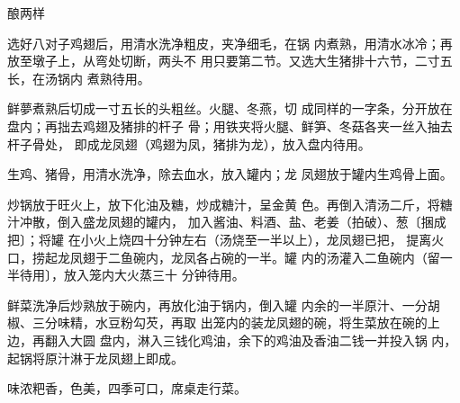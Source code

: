 \begin{recipe}[酿龙凤翅]{酿两样}

\ingredients


\cooking

\step 选好八对子鸡翅后，用清水洗净粗皮，夹净细毛，在锅 内煮熟，用清水冰冷；再放至墩子上，从弯处切断，两头不 用只要第二节。又选大生猪排十六节，二寸五长，在汤锅内 煮熟待用。

\step 	鲜夢煮熟后切成一寸五长的头粗丝。火腿、冬燕，切 成同样的一字条，分开放在盘内；再拙去鸡翅及猪排的杆子 骨；用铁夹将火腿、鲜笋、冬菇各夹一丝入抽去杆子骨处， 即成龙凤翅（鸡翅为凤，猪排为龙），放入盘内待用。

\step 	生鸡、猪骨，用清水洗净，除去血水，放入罐内；龙 凤翅放于罐内生鸡骨上面。

\step 	炒锅放于旺火上，放下化油及糖，炒成糖汁，呈金黄 色。再倒入清汤二斤，将糖汁冲散，倒入盛龙凤翅的罐内， 加入酱油、料酒、盐、老姜（拍破）、葱〔捆成把〕；将罐 在小火上烧四十分钟左右（汤烧至一半以上），龙凤翅已把， 提离火口，捞起龙凤翅于二鱼碗内，龙凤各占碗的一半。罐 内的汤灌入二鱼碗内（留一半待用〕，放入笼内大火蒸三十 分钟待用。

\step 	鲜菜洗净后炒熟放于碗内，再放化油于锅内，倒入罐 内余的一半原汁、一分胡椒、三分味精，水豆粉勾芡，再取 出笼内的装龙凤翅的碗，将生菜放在碗的上边，再翻入大圆 盘内，淋入三钱化鸡油，余下的鸡油及香油二钱一并投入锅 内，起锅将原汁淋于龙凤翅上即成。

\notes

味浓粑香，色美，四季可口，席桌走行菜。

\end{recipe}

